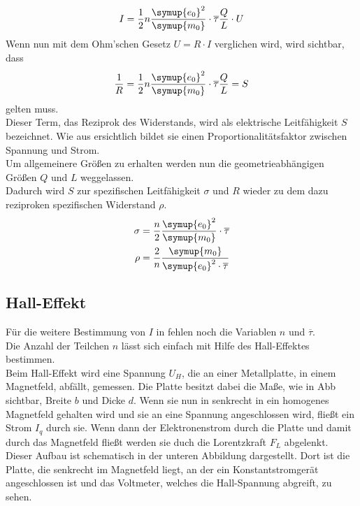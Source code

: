 \begin{equation}
  I=\frac{1}{2}n\frac{\symup{e_0}^2}{\symup{m_0}}\cdot \overline{\tau} \frac{Q}{L} \cdot U
  \label{eqn:ohm1}
\end{equation}
Wenn nun  mit dem Ohm'schen Gesetz $U=R\cdot I$ verglichen wird, wird sichtbar, dass 
\begin{equation}
  \frac{1}{R}=\frac{1}{2}n\frac{\symup{e_0}^2}{\symup{m_0}}\cdot \overline{\tau} \frac{Q}{L} = S\nonumber
\end{equation}
gelten muss.\\
Dieser Term, das Reziprok des Widerstands, wird als elektrische Leitfähigkeit $S$ bezeichnet. Wie aus  ersichtlich bildet
sie einen Proportionalitätsfaktor zwischen Spannung und Strom.\\
Um allgemeinere Größen zu erhalten werden nun die geometrieabhängigen Größen $Q$ und $L$ weggelassen.\\
Dadurch wird $S$ zur spezifischen Leitfähigkeit $\sigma$ und $R$ wieder zu dem dazu reziproken spezifischen Widerstand $\rho$.
\begin{align}
  \sigma&=\frac{n}{2}\frac{\symup{e_0}^2}{\symup{m_0}}\cdot \overline{\tau}  \label{eqn:sigma}\\
  \rho &=\frac{2}{n}\frac{\symup{m_0}}{\symup{e_0}^2 \cdot \overline{\tau}}  \label{eqn:rho}
\end{align}



\subsection{Hall-Effekt}

Für die weitere Bestimmung von $I$ in  fehlen noch die Variablen $n$ und $\overline{\tau}$.\\
Die Anzahl der Teilchen $n$ lässt sich einfach mit Hilfe des Hall-Effektes bestimmen.\\
Beim Hall-Effekt wird eine Spannung $U_H$, die an einer Metallplatte, in einem Magnetfeld, abfällt, gemessen.
Die Platte besitzt dabei die Maße, wie in Abb  sichtbar, Breite $b$ und Dicke $d$.
Wenn sie nun in senkrecht in ein homogenes Magnetfeld gehalten wird und sie an eine Spannung angeschlossen wird, fließt ein Strom $I_q$ durch sie.
Wenn dann der Elektronenstrom durch die Platte und damit durch das Magnetfeld fließt werden sie duch die Lorentzkraft $F_L$ abgelenkt.\\
Dieser Aufbau ist schematisch in der unteren Abbildung  dargestellt. Dort ist die Platte, die senkrecht im Magnetfeld liegt, 
an der ein Konstantstromgerät angeschlossen ist und das Voltmeter, welches die Hall-Spannung abgreift, zu sehen. 

